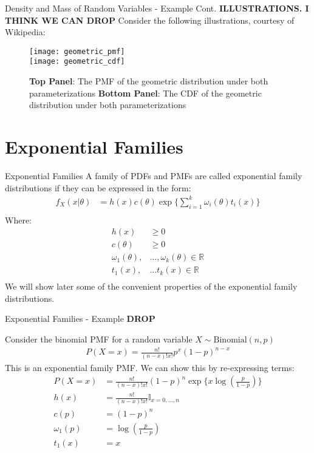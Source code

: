 \documentclass{beamer}
\begin{document}
\begin{frame}{Density and Mass of Random Variables - Example Cont.}
\textbf{ILLUSTRATIONS. I THINK WE CAN DROP}
Consider the following illustrations, courtesy of Wikipedia:
\begin{center}
\begin{figure}
\texttt{[image: geometric\_pmf]}\\
\texttt{[image: geometric\_cdf]}
\caption{\textbf{Top Panel}: The PMF of the geometric distribution under both parameterizations \textbf{Bottom Panel}: The CDF of the geometric distribution under both parameterizations}
\end{figure}
\end{center}
\end{frame}

\section{Exponential Families}

\begin{frame}{Exponential Families}
A family of PDFs and PMFs are called exponential family distributions if they can be expressed in the form:
\begin{align*}
f_{X}(x|\theta) &= h(x) c(\theta)\exp\{\sum_{i = 1}^{k}\omega_{i}(\theta)t_{i}(x)\}\\
\end{align*}
Where:
\begin{align*}
h(x) &\geq 0 \\
c(\theta) &\geq 0 \\
\omega_{1}(\theta),&\ldots,\omega_{k}(\theta) \in \mathbb{R}\\
t_{1}(x),&\ldots t_{k}(x) \in \mathbb{R}\\
\end{align*}
We will show later some of the convenient properties of the exponential family distributions.

\end{frame}

\begin{frame}{Exponential Families - Example}
\textbf{DROP}

Consider the binomial PMF for a random variable $X\sim\mathrm{Binomial}(n, p)$
\begin{align*}
P(X = x) = \frac{n!}{(n - x)!x!} p^{x} (1-p)^{n-x}
\end{align*}
This is an exponential family PMF. We can show this by re-expressing terms:
\begin{align*}
P(X = x) &= \frac{n!}{(n - x)!x!} (1-p)^{n} \exp\{x\log(\frac{p}{1-p}) \} \\
h(x) &= \frac{n!}{(n - x)!x!} \mathbb{I}_{x = 0, \ldots, n}\\
c(p) &= (1-p)^{n} \\
\omega_{1}(p) &= \log(\frac{p}{1-p}) \\
t_{1}(x) &= x \\
\end{align*}
\end{frame}
\end{document}
